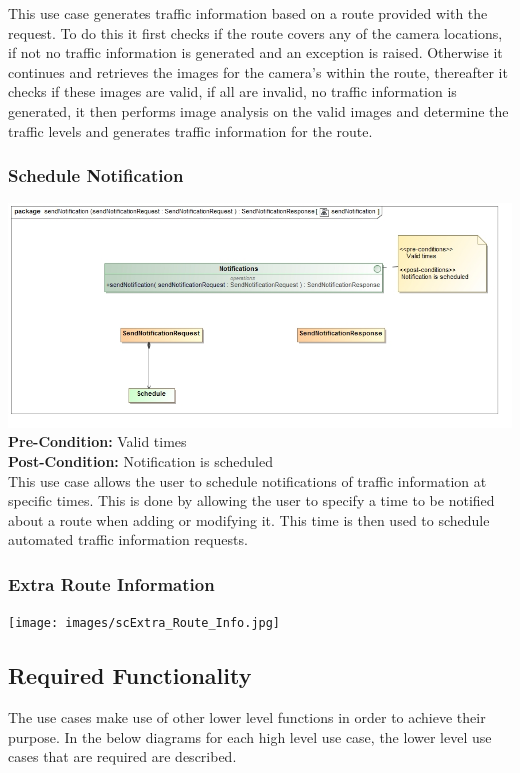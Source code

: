 \documentclass[a4paper,12pt]{article}
\begin{document}
This use case generates traffic information based on a route provided with the request. To do this it first checks if the route covers any of the camera locations, if not no traffic information is generated and an exception is raised. Otherwise it continues and retrieves the images for the camera's within the route, thereafter it checks if these images are valid, if all are invalid, no traffic information is generated, it then performs image analysis on the valid images and determine the traffic levels and generates traffic information for the route.

\subsubsection{Schedule Notification}
\includegraphics[width=\textwidth]{images/scSchedule_Notification.jpg}
\textbf{Pre-Condition: }
Valid times\\
\textbf{Post-Condition: }
Notification is scheduled\\

This use case allows the user to schedule notifications of traffic information at specific times. This is done by allowing the user to specify a time to be notified about a route when adding or modifying it. This time is then used to schedule automated traffic information requests.

\subsubsection{Extra Route Information}
\texttt{[image: images/scExtra\_Route\_Info.jpg]}


\subsection{Required Functionality}
The use cases make use of other lower level functions in order to achieve their purpose. In the below diagrams for each high level use case, the lower level use cases that are required are described.
\end{document}
